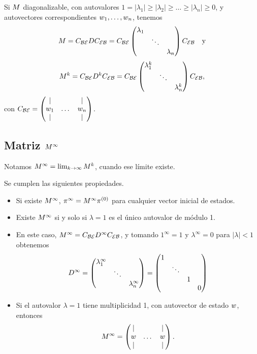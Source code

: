 Si $\Mb$ diagonalizable, con autovalores $1 = |\lambda_1| \ge |\lambda_2| \ge \dots \ge |\lambda_n| \ge 0$, y autovectores correspondientes $\wb_1, \dots, \wb_n$, tenemos
$$
\Mb = \Cb_{\B\E} \Db \Cb_{\E\B} = \Cb_{\B\E} \begin{pmatrix} \lambda_1 & & \\ & \ddots & \\ & & \lambda_n \end{pmatrix} \Cb_{\E\B} \quad \text{y}
$$
$$
\Mb^k = \Cb_{\B\E} \Db^{k} \Cb_{\E\B} = \Cb_{\B\E} \begin{pmatrix} \lambda_1^k & & \\ & \ddots & \\ & & \lambda_n^k \end{pmatrix} \Cb_{\E\B},
$$
con $\Cb_{\B\E} = \begin{pmatrix} \vert & & \vert \\ \wb_1 & \dots & \wb_n \\ \vert & & \vert \end{pmatrix}$.

\subsection{Matriz $\Mb^{\infty}$}

Notamos $\Mb^{\infty} = \lim_{k \rightarrow \infty} \Mb^k$, cuando ese límite existe.

\begin{prop} Se cumplen las siguientes propiedades.
\begin{itemize}
\item Si existe $\Mb^{\infty}$, $\pib^{\infty} = \Mb^{\infty} \pib^{(0)}$ para cualquier vector inicial de estados.
\item Existe $\Mb^{\infty}$ si y solo si $\lambda = 1$ es el único autovalor de módulo 1.
\item En este caso,
$\Mb^\infty = \Cb_{\B\E} \Db^\infty \Cb_{\E\B}$, y tomando $1^\infty = 1$ y $\lambda^\infty = 0$ para $|\lambda| < 1$ obtenemos 
$$\Db^\infty = \begin{pmatrix} \lambda_1^\infty & & \\ & \ddots & \\ & & \lambda_n^\infty \end{pmatrix} =
{\begin{pmatrix} \begin{matrix} 1 & & \\ & \ddots & \\ & & 1\end{matrix} &  \\  & 0\end{pmatrix}}$$
\item Si el autovalor $\lambda = 1$ tiene multiplicidad 1, con autovector de estado $\wb$, entonces
$$
\Mb^{\infty} = \begin{pmatrix} \vert & & \vert \\ \wb & \dots & \wb \\ \vert & & \vert \end{pmatrix}.
$$
\end{itemize}
\end{prop}


